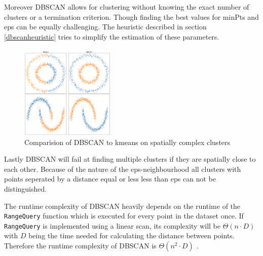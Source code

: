 Moreover DBSCAN allows for clustering without knowing the exact number of clusters or a termination criterion. Though finding the best values for minPts and eps can be equally challenging. The heuristic described in section \ref{dbscanheuristic} tries to simplify the estimation of these parameters.
\begin{figure}
    \centering
    \includegraphics[width=0.4\textwidth]{../plots/dbscan/dbscan_comp}
    \caption{Comparision of DBSCAN to kmeans on spatially complex clusters}
    \label{fig:dbscanadv}
\end{figure}

Lastly DBSCAN will fail at finding multiple clusters if they are spatially close to each other. Because of the nature of the eps-neighbourhood all clusters with points seperated by a distance equal or less less than eps can not be distinguished.

The runtime complexity of DBSCAN heavily depends on the runtime of the \texttt{RangeQuery} function which is executed for every point in the dataset once.
If \texttt{RangeQuery} is implemented using a linear scan, its complexity will be $\Theta (n \cdot D)$ with $D$ being the time needed for calculating the distance between points. Therefore the runtime complexity of DBSCAN is $\Theta(n^2 \cdot D)$ \cite{dbscanrevisited}.